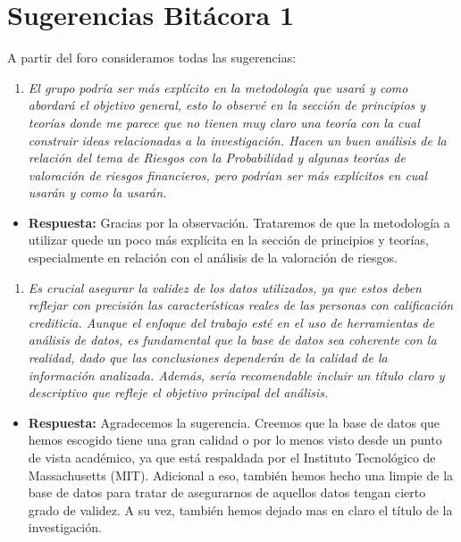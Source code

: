 \documentclass[
  letterpaper,
  DIV=11,
  numbers=noendperiod]{scrreprt}
\providecommand{\tightlist}{%
  \setlength{\itemsep}{0pt}\setlength{\parskip}{0pt}}\usepackage{longtable,booktabs,array}
\begin{document}
\section{Sugerencias Bitácora 1}\label{sugerencias-bituxe1cora-1}

A partir del foro consideramos todas las sugerencias:

\begin{enumerate}
\def\labelenumi{\arabic{enumi}.}
\tightlist
\item
  \emph{El grupo podría ser más explícito en la metodología que usará y
  como abordará el objetivo general, esto lo observé en la sección de
  principios y teorías donde me parece que no tienen muy claro una
  teoría con la cual construir ideas relacionadas a la investigación.
  Hacen un buen análisis de la relación del tema de Riesgos con la
  Probabilidad y algunas teorías de valoración de riesgos financieros,
  pero podrían ser más explícitos en cual usarán y como la usarán.}
\end{enumerate}

\begin{itemize}
\tightlist
\item
  \textbf{Respuesta:} Gracias por la observación. Trataremos de que la
  metodología a utilizar quede un poco más explícita en la sección de
  principios y teorías, especialmente en relación con el análisis de la
  valoración de riesgos.
\end{itemize}

\begin{enumerate}
\def\labelenumi{\arabic{enumi}.}
\setcounter{enumi}{1}
\tightlist
\item
  \emph{Es crucial asegurar la validez de los datos utilizados, ya que
  estos deben reflejar con precisión las características reales de las
  personas con calificación crediticia. Aunque el enfoque del trabajo
  esté en el uso de herramientas de análisis de datos, es fundamental
  que la base de datos sea coherente con la realidad, dado que las
  conclusiones dependerán de la calidad de la información analizada.
  Además, sería recomendable incluir un título claro y descriptivo que
  refleje el objetivo principal del análisis.}
\end{enumerate}

\begin{itemize}
\tightlist
\item
  \textbf{Respuesta:} Agradecemos la sugerencia. Creemos que la base de
  datos que hemos escogido tiene una gran calidad o por lo menos visto
  desde un punto de vista académico, ya que está respaldada por el
  Instituto Tecnológico de Massachusetts (MIT). Adicional a eso, también
  hemos hecho una limpie de la base de datos para tratar de asegurarnos
  de aquellos datos tengan cierto grado de validez. A su vez, también
  hemos dejado mas en claro el título de la investigación.
\end{itemize}
\end{document}
